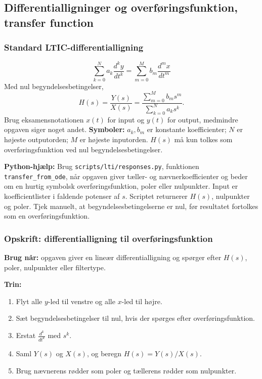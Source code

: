 \subsection{Differentialligninger og overføringsfunktion, transfer function}

\subsubsection{Standard LTIC-differentialligning}
\[
\sum_{k=0}^{N}a_k\frac{d^k y}{dt^k}
=
\sum_{m=0}^{M}b_m\frac{d^m x}{dt^m}
\]
Med nul begyndelsesbetingelser,
\[
H(s)=\frac{Y(s)}{X(s)}
=
\frac{\sum_{m=0}^{M}b_m s^m}{\sum_{k=0}^{N}a_k s^k}.
\]
Brug eksamensnotationen \(x(t)\) for input og \(y(t)\) for output, medmindre opgaven siger noget andet.
\textbf{Symboler:} \(a_k,b_m\) er konstante koefficienter; \(N\) er højeste outputorden; \(M\) er højeste inputorden. \(H(s)\) må kun tolkes som overføringsfunktion ved nul begyndelsesbetingelser.

\textbf{Python-hjælp:} Brug \texttt{scripts/lti/responses.py}, funktionen \texttt{transfer\_from\_ode}, når opgaven giver tæller- og nævnerkoefficienter og beder om en hurtig symbolsk overføringsfunktion, poler eller nulpunkter. Input er koefficientlister i faldende potenser af \(s\). Scriptet returnerer \(H(s)\), nulpunkter og poler. Tjek manuelt, at begyndelsesbetingelserne er nul, før resultatet fortolkes som en overføringsfunktion.

\subsubsection{Opskrift: differentialligning til overføringsfunktion}
\textbf{Brug når:} opgaven giver en lineær differentialligning og spørger efter \(H(s)\), poler, nulpunkter eller filtertype.

\textbf{Trin:}
\begin{enumerate}
    \item Flyt alle \(y\)-led til venstre og alle \(x\)-led til højre.
    \item Sæt begyndelsesbetingelser til nul, hvis der spørges efter overføringsfunktion.
    \item Erstat \(\frac{d^k}{dt^k}\) med \(s^k\).
    \item Saml \(Y(s)\) og \(X(s)\), og beregn \(H(s)=Y(s)/X(s)\).
    \item Brug nævnerens rødder som poler og tællerens rødder som nulpunkter.
\end{enumerate}

